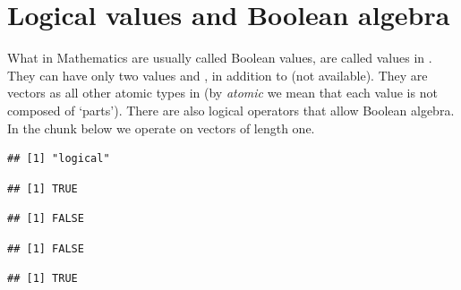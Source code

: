 \documentclass[krantz2]{krantz}\usepackage{knitr}%
\begin{document}

\section{Logical values and Boolean algebra}\label{sec:calc:boolean}
What in Mathematics are usually called Boolean values, are called  values in \Rlang. They can have only two values  and , in addition to  (not available). They are vectors as all other atomic types in \Rlang (by \emph{atomic} we mean that each value is not composed of `parts'). There are also logical operators that allow Boolean algebra. In the chunk below we operate on  vectors of length one.

\begin{knitrout}\footnotesize
{}\color{fgcolor}\begin{kframe}
\begin{alltt}
 \hlkwb{<-} 
 \hlkwb{<-} 
\end{alltt}
\begin{verbatim}
## [1] "logical"
\end{verbatim}
\begin{alltt}
\end{alltt}
\begin{verbatim}
## [1] TRUE
\end{verbatim}
\begin{alltt}
\hlopt{!} 
\end{alltt}
\begin{verbatim}
## [1] FALSE
\end{verbatim}
\begin{alltt}
 \hlopt{&&}  
\end{alltt}
\begin{verbatim}
## [1] FALSE
\end{verbatim}
\begin{alltt}
 \hlopt{||}  
\end{alltt}
\begin{verbatim}
## [1] TRUE
\end{verbatim}
\end{kframe}
\end{knitrout}
\end{document}
